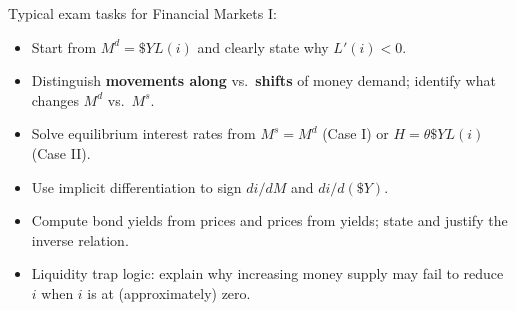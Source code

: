 \begin{examtip}
Typical exam tasks for Financial Markets I:
\begin{itemize}
  \item Start from $M^d=\$Y L(i)$ and clearly state why $L'(i)<0$.
  \item Distinguish \textbf{movements along} vs.\ \textbf{shifts} of money demand; identify what changes $M^d$ vs.\ $M^s$.
  \item Solve equilibrium interest rates from $M^s=M^d$ (Case I) or $H=\theta \$Y L(i)$ (Case II).
  \item Use implicit differentiation to sign $di/dM$ and $di/d(\$Y)$.
  \item Compute bond yields from prices and prices from yields; state and justify the inverse relation.
  \item Liquidity trap logic: explain why increasing money supply may fail to reduce $i$ when $i$ is at (approximately) zero.
\end{itemize}
\end{examtip}
